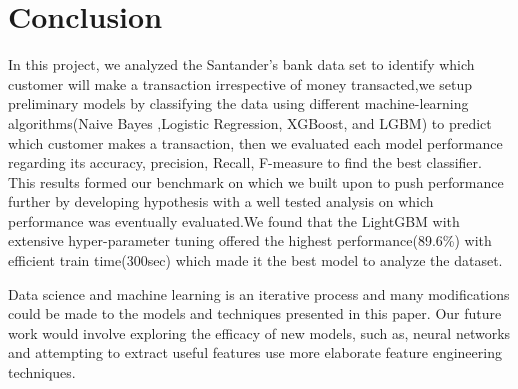\documentclass[journal,twoside,web]{ieeecolor}
\begin{document}

\section{Conclusion}
In this project, we analyzed the Santander's bank data set to identify which customer will make a transaction irrespective of money transacted,we setup preliminary models by  classifying the data using different machine-learning algorithms(Naive Bayes ,Logistic Regression, XGBoost, and LGBM) to predict which customer makes a transaction, then we evaluated each model performance regarding its accuracy, precision, Recall, F-measure to find the best classifier. This results formed our benchmark on which we built upon to push performance further by developing hypothesis with a well tested analysis on which performance was eventually evaluated.We found that the LightGBM with extensive hyper-parameter tuning offered the highest performance(89.6\%) with efficient train time(300sec) which made it the best model to analyze the dataset.

Data science and machine learning is an iterative process and many modifications could be made to the models and techniques presented in this paper. Our future work would involve exploring the efficacy of new models, such as, neural networks and attempting to extract useful features use more elaborate feature engineering techniques.





\appendices



\clearpage{}
\end{document}
